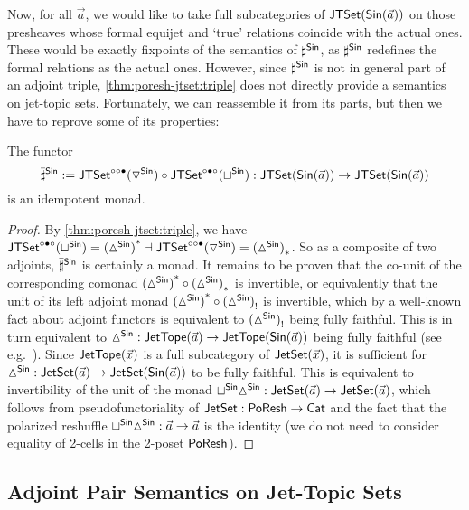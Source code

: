 \documentclass[a4paper]{memoir}
\begin{document}
{Now, for all $\vec a$, we would like to take full subcategories of $\mathsf{JTSet}({\mathsf{Sin}}(\vec a))$ on those presheaves whose formal equijet and `true' relations coincide with the actual ones.
These would be exactly fixpoints of the semantics of $\sharp^{\mathsf{Sin}}$, as $\sharp^{\mathsf{Sin}}$ redefines the formal relations as the actual ones.
However, since $\sharp^{\mathsf{Sin}}$ is not in general part of an adjoint triple, \cref{thm:poresh-jtset:triple} does not directly provide a semantics on jet-topic sets.
Fortunately, we can reassemble it from its parts, but then we have to reprove some of its properties:
\begin{proposition}
	The functor
	\[
		{\bar \sharp}^{\mathsf{Sin}} := \mathsf{JTSet}^{\circ \circ \bullet}({\triangledown}^{\mathsf{Sin}}) \circ \mathsf{JTSet}^{\circ \bullet \circ}({\sqcup}^{\mathsf{Sin}}) : \mathsf{JTSet}({\mathsf{Sin}}(\vec a)) \to \mathsf{JTSet}({\mathsf{Sin}}(\vec a))
	\]
	is an idempotent monad.
\end{proposition}
\begin{proof}
	By \cref{thm:poresh-jtset:triple}, we have $\mathsf{JTSet}^{\circ \bullet \circ}({\sqcup}^{\mathsf{Sin}}) = {({\vartriangle}^{\mathsf{Sin}})}^* \dashv \mathsf{JTSet}^{\circ \circ \bullet}({\triangledown}^{\mathsf{Sin}}) = {({\vartriangle}^{\mathsf{Sin}})}_*$.
	So as a composite of two adjoints, ${\bar \sharp}^{\mathsf{Sin}}$ is certainly a monad.
	It remains to be proven that the co-unit of the corresponding comonad ${({\vartriangle}^{\mathsf{Sin}})}^* \circ {({\vartriangle}^{\mathsf{Sin}})}_*$ is invertible,
	or equivalently that the unit of its left adjoint monad ${({\vartriangle}^{\mathsf{Sin}})}^* \circ {({\vartriangle}^{\mathsf{Sin}})}_!$ is invertible,
	which by a well-known fact about adjoint functors \cite[v141, prop.\ 3.4]{nlab:adjoint-functor} is equivalent to ${({\vartriangle}^{\mathsf{Sin}})}_!$ being fully faithful.
	This is in turn equivalent to ${\vartriangle}^{\mathsf{Sin}} : \mathsf{JetTope}(\vec a) \to \mathsf{JetTope}({\mathsf{Sin}}(\vec a))$ being fully faithful (see e.g.\ \cite[v4, thm.\ 2.3.4]{transpension-techreport}).
	Since $\mathsf{JetTope}(\vec x)$ is a full subcategory of $\mathsf{JetSet}(\vec x)$,
	it is sufficient for ${\vartriangle}^{\mathsf{Sin}} : \mathsf{JetSet}(\vec a) \to \mathsf{JetSet}({\mathsf{Sin}}(\vec a))$ to be fully faithful.
	This is equivalent to invertibility of the unit of the monad ${\sqcup}^{\mathsf{Sin}} {\vartriangle}^{\mathsf{Sin}} : \mathsf{JetSet}(\vec a) \to \mathsf{JetSet}(\vec a)$, which follows from pseudofunctoriality of $\mathsf{JetSet} : \mathsf{PoResh} \to {\mathsf{Cat}}$ and the fact that the polarized reshuffle ${\sqcup}^{\mathsf{Sin}} {\vartriangle}^{\mathsf{Sin}} : \vec a \to \vec a$ is the identity (we do not need to consider equality of 2-cells in the 2-poset $\mathsf{PoResh}$).
\end{proof}

\subsection{Adjoint Pair Semantics on Jet-Topic Sets} \label{sec:poresh-jtset:pair}
} %
\end{document}
